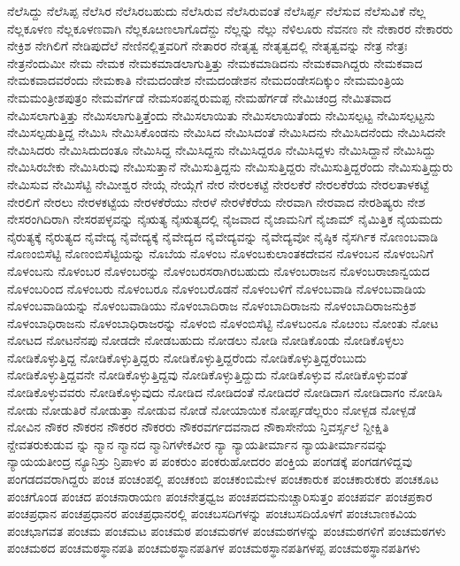 {ನೆಲೆಸಿದ್ದು
ನೆಲೆಸಿಪ್ಪ
ನೆಲೆಸಿರ
ನೆಲೆಸಿರಬಹುದು
ನೆಲೆಸಿರುವ
ನೆಲೆಸಿರುವಂತೆ
ನೆಲೆಸಿರ್ಪ್ಪ
ನೆಲೆಸುವ
ನೆಲೆಸುವಿಕೆ
ನೆಲ್ಲ
ನೆಲ್ಲಕೂಳಣ
ನೆಲ್ಲಕೂಳಣವಾಗಿ
ನೆಲ್ಲಕೂೞಣಲಾಗೊದೆನ್ದು
ನೆಲ್ಲನ್ನು
ನೆಲ್ಲು
ನೆಳಿಲೂರು
ನೆವನಣ
ನೇ
ನೇಕಾರರ
ನೇಕಾರರು
ನೇಕ್ರಿಶ
ನೇಗಿಲಿಗೆ
ನೇಡಿಪುದೆಲೆ
ನೇಣಿನಲ್ಲಿತ್ತವರಿಗೆ
ನೇತಾರರ
ನೇತೃತ್ವ
ನೇತೃತ್ವದಲ್ಲಿ
ನೇತೃತ್ವವನ್ನು
ನೇತ್ರ
ನೇತ್ರಃ
ನೇತ್ರನೆಂದುಮೀ
ನೇಮ
ನೇಮಕ
ನೇಮಕಮಾಡಲಾಗುತ್ತಿತ್ತು
ನೇಮಕಮಾಡಿದನು
ನೇಮಕವಾಗಿದ್ದರು
ನೇಮಕವಾದ
ನೇಮಕವಾದವರೆಂದು
ನೇಮಕಾತಿ
ನೇಮದಂಡೇಶ
ನೇಮದಂಡೇಶನ
ನೇಮದಂಡೇಸದಿಕ್ಕುಂ
ನೇಮಮಂತ್ರಿಯ
ನೇಮಮಂತ್ರೀಶಪುತ್ರಂ
ನೇಮವೆರ್ಗಡೆ
ನೇಮಸಂಪನ್ನರುಮಪ್ಪ
ನೇಮಹೆರ್ಗಡೆ
ನೇಮಿಚಂದ್ರ
ನೇಮಿತವಾದ
ನೇಮಿಸಲಾಗುತ್ತಿತ್ತು
ನೇಮಿಸಲಾಗುತ್ತಿತ್ತೆಂದು
ನೇಮಿಸಲಾಯಿತು
ನೇಮಿಸಲಾಯಿತೆಂದು
ನೇಮಿಸಲ್ಪಟ್ಟ
ನೇಮಿಸಲ್ಪಟ್ಟನು
ನೇಮಿಸಲ್ಪಡುತ್ತಿದ್ದ
ನೇಮಿಸಿ
ನೇಮಿಸಿಕೊಂಡನು
ನೇಮಿಸಿದ
ನೇಮಿಸಿದಂತೆ
ನೇಮಿಸಿದನು
ನೇಮಿಸಿದನೆಂದು
ನೇಮಿಸಿದನೇ
ನೇಮಿಸಿದರು
ನೇಮಿಸಿದುದಂತೂ
ನೇಮಿಸಿದ್ದ
ನೇಮಿಸಿದ್ದನು
ನೇಮಿಸಿದ್ದರೂ
ನೇಮಿಸಿದ್ದಳು
ನೇಮಿಸಿದ್ದಾನೆ
ನೇಮಿಸಿದ್ದು
ನೇಮಿಸಿರಬೇಕು
ನೇಮಿಸಿರುವು
ನೇಮಿಸುತ್ತಾನೆ
ನೇಮಿಸುತ್ತಿದ್ದನು
ನೇಮಿಸುತ್ತಿದ್ದರು
ನೇಮಿಸುತ್ತಿದ್ದರೆಂದು
ನೇಮಿಸುತ್ತಿದ್ದುರು
ನೇಮಿಸುವ
ನೇಮಿಸೆಟ್ಟಿ
ನೇಮೀಶ್ವರ
ನೇಯ್ಗೆ
ನೇಯ್ಗೆಗೆ
ನೇರ
ನೇರಲಕಟ್ಟೆ
ನೇರಲಕೆರೆ
ನೇರಲಕೆರೆಯ
ನೇರಲತಾಳಕಟ್ಟೆ
ನೇರಲಿಗೆ
ನೇರಲು
ನೇರಳಕಟ್ಟೆಯ
ನೇರಳಕೆರೆಯು
ನೇರಳೆ
ನೇರಳೆಕೆರೆಯ
ನೇರವಾಗಿ
ನೇರವಾದ
ನೇರಶಿಷ್ಯರು
ನೇಶ
ನೇಸರಂಗಿದಿರಾಗಿ
ನೇಸರಪಳ್ಳವನ್ನು
ನೈಋತ್ಯ
ನೈಋತ್ಯದಲ್ಲಿ
ನೈಜವಾದ
ನೈಜಾಮನಿಗೆ
ನೈಜಾಮ್
ನೈಮಿತ್ತಿಕ
ನೈಯಮದು
ನೈರುತ್ಯಕ್ಕೆ
ನೈರುತ್ಯದ
ನೈವೇದ್ಯ
ನೈವೇದ್ಯಕ್ಕೆ
ನೈವೇದ್ಯದ
ನೈವೇದ್ಯವನ್ನು
ನೈವೇದ್ಯವೋ
ನೈಷ್ಠಿಕ
ನೈಸರ್ಗಿಕ
ನೊಣಂಬವಾಡಿ
ನೊಣಂಬಿಸೆಟ್ಟಿ
ನೊಣಂಬಿಸೆಟ್ಟಿಯನ್ನು
ನೊಬೆಯ
ನೊಳಂಬ
ನೊಳಂಬಕುಲಾಂತಕದೇವನ
ನೊಳಂಬನ
ನೊಳಂಬನಿಗೆ
ನೊಳಂಬನು
ನೊಳಂಬರ
ನೊಳಂಬರನ್ನು
ನೊಳಂಬರಸರಾಗಿರಬಹುದು
ನೊಳಂಬರಾಜನ
ನೊಳಂಬರಾಜಾನ್ವಯದ
ನೊಳಂಬರಿಂದ
ನೊಳಂಬರು
ನೊಳಂಬರೂ
ನೊಳಂಬರೊಡನೆ
ನೊಳಂಬಳಿಗೆ
ನೊಳಂಬವಾಡಿ
ನೊಳಂಬವಾಡಿಯ
ನೊಳಂಬವಾಡಿಯನ್ನು
ನೊಳಂಬವಾಡಿಯು
ನೊಳಂಬಾದಿರಾಜ
ನೊಳಂಬಾದಿರಾಜನು
ನೊಳಂಬಾದಿರಾಜನುಕ್ರಿಶ
ನೊಳಂಬಾಧಿರಾಜನು
ನೊಳಂಬಾಧಿರಾಜರನ್ನು
ನೊಳಂಬಿ
ನೊಳಂಬಿಸೆಟ್ಟಿ
ನೊಳಬಂನೂ
ನೊೞಂಬ
ನೋಂತು
ನೋಟ
ನೋಟದ
ನೋಟನೆನಪು
ನೋಡದೇ
ನೋಡಬಹುದು
ನೋಡಲು
ನೋಡಿ
ನೋಡಿಕೊಂಡು
ನೋಡಿಕೊಳ್ಳಲು
ನೋಡಿಕೊಳ್ಳುತ್ತಿದ್ದ
ನೋಡಿಕೊಳ್ಳುತ್ತಿದ್ದರು
ನೋಡಿಕೊಳ್ಳುತ್ತಿದ್ದರೆಂದು
ನೋಡಿಕೊಳ್ಳುತ್ತಿದ್ದರೆಂಬುದು
ನೋಡಿಕೊಳ್ಳುತ್ತಿದ್ದವನೇ
ನೋಡಿಕೊಳ್ಳುತ್ತಿದ್ದವು
ನೋಡಿಕೊಳ್ಳುತ್ತಿದ್ದುದು
ನೋಡಿಕೊಳ್ಳುವ
ನೋಡಿಕೊಳ್ಳುವಂತೆ
ನೋಡಿಕೊಳ್ಳುವವರು
ನೋಡಿಕೊಳ್ಳುವುದು
ನೋಡಿದ
ನೋಡಿದಂತೆ
ನೋಡಿದರೆ
ನೋಡಿದಾಗ
ನೋಡಿದಾಗಂ
ನೋಡಿಸಿ
ನೋಡು
ನೋಡುತಿರೆ
ನೋಡುತ್ತಾ
ನೋಡುವ
ನೋಡೆ
ನೋಯಾಯಿಕ
ನೋರ್ಪ್ಪಡೆಲ್ಲರುಂ
ನೋಳ್ಪಡ
ನೋಳ್ಪಡೆ
ನೋವಿನ
ನೌಕರ
ನೌಕರನ
ನೌಕರರ
ನೌಕರರು
ನೌಕರವರ್ಗದವನಾದ
ನೌಕಾಸೇನೆಯ
ನ್ತಿವರ್ಸ್ಸಲೆ
ನ್ದೀಕ್ಷಿತಿ
ನ್ದೇವತರುಕುಡುವ
ನ್ನು
ನ್ಮಾನ
ನ್ಮಾನದ
ನ್ಮಾನಿಗಳೇಕವೀರ
ನ್ಯಾ
ನ್ಯಾಯತೀರ್ಮಾನ
ನ್ಯಾಯತೀರ್ಮಾನವನ್ನು
ನ್ಯಾಯಯತೀಂದ್ರ
ನ್ಯೂನಿಸ್ರು
ನ್ರಿಪಾಳಂ
ಪ
ಪಂಕರುಂ
ಪಂಕರುಹೋದರಂ
ಪಂಕ್ತಿಯ
ಪಂಗಡಕ್ಕೆ
ಪಂಗಡಗಳಿದ್ದವು
ಪಂಗಡದವರಾಗಿದ್ದರು
ಪಂಚ
ಪಂಚಂಪಲ್ಲಿ
ಪಂಚಕಂಬಿ
ಪಂಚಕಂಬಿಮೇಳ
ಪಂಚಕಾರುಕ
ಪಂಚಕಾರುಕರು
ಪಂಚಕೂಟ
ಪಂಚಗೊಂಡ
ಪಂಚದ
ಪಂಚನಾರಾಯಣ
ಪಂಚನೇತ್ರಧ್ವಜ
ಪಂಚಪದಮನುಚ್ಚಾರಿಸುತ್ತಂ
ಪಂಚಪರ್ವ
ಪಂಚಪ್ರಕಾರ
ಪಂಚಪ್ರಧಾನ
ಪಂಚಪ್ರಧಾನರ
ಪಂಚಪ್ರಧಾನರಲ್ಲಿ
ಪಂಚಬಸದಿಗಳನ್ನು
ಪಂಚಬಸದಿಯೊಳಗೆ
ಪಂಚಬಾಣಕವಿಯ
ಪಂಚಭಾಗವತ
ಪಂಚಮ
ಪಂಚಮಟ
ಪಂಚಮಠ
ಪಂಚಮಠಗಳ
ಪಂಚಮಠಗಳನ್ನು
ಪಂಚಮಠಗಳಿಗೆ
ಪಂಚಮಠಗಳು
ಪಂಚಮಠದ
ಪಂಚಮಠಸ್ಥಾನಪತಿ
ಪಂಚಮಠಸ್ಥಾನಪತಿಗಳ
ಪಂಚಮಠಸ್ಥಾನಪತಿಗಳಪ್ಪ
ಪಂಚಮಠಸ್ಥಾನಪತಿಗಳು
}
